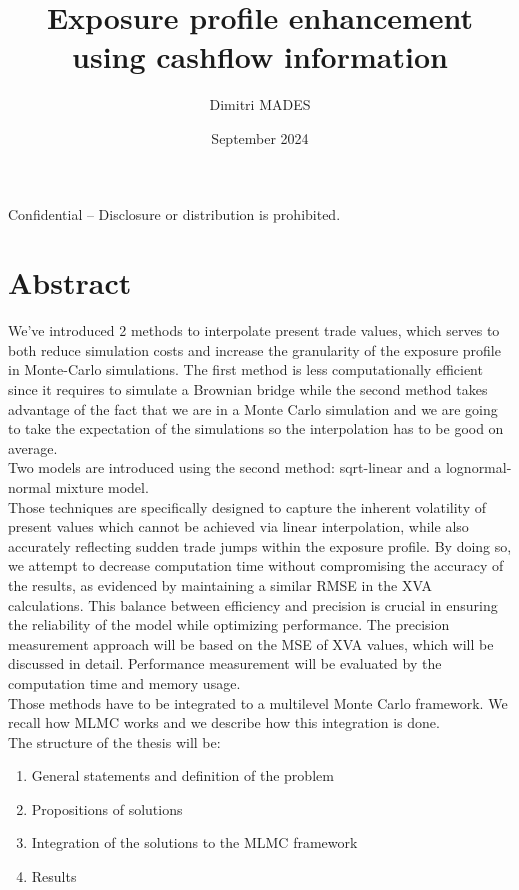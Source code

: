 \documentclass{article}
\title{Exposure profile enhancement using cashflow information}
\author{Dimitri MADES}
\date{September 2024}
\begin{document}
\maketitle

\begin{center}
Confidential – Disclosure or distribution is prohibited.
\end{center}

\newpage

\section*{Abstract}

\noindent

We've introduced 2 methods to interpolate present trade values, which serves to both reduce simulation costs and increase the granularity of the exposure profile in Monte-Carlo simulations. 
The first method is less computationally efficient since it requires to simulate a Brownian bridge while the second method takes advantage of the fact that we are in a Monte Carlo simulation and we are going to take the expectation of the simulations so the interpolation has to be good on average.\\
Two models are introduced using the second method: sqrt-linear and a lognormal-normal mixture model.
\\Those techniques are specifically designed to capture the inherent volatility of present values which cannot be achieved via linear interpolation, while also accurately reflecting sudden trade jumps within the exposure profile. By doing so, we attempt to decrease computation time without compromising the accuracy of the results, as evidenced by maintaining a similar RMSE in the XVA calculations. This balance between efficiency and precision is crucial in ensuring the reliability of the model while optimizing performance. The precision measurement approach will be based on the MSE of XVA values, which will be discussed in detail. Performance measurement will be evaluated by the computation time and memory usage.\\
Those methods have to be integrated to a multilevel Monte Carlo framework. We recall how MLMC works and we describe how this integration is done.\\


The structure of the thesis will be:
\begin{enumerate}
    \item General statements and definition of the problem
    \item Propositions of solutions
    \item Integration of the solutions to the MLMC framework
    \item Results
\end{enumerate}
\end{document}
